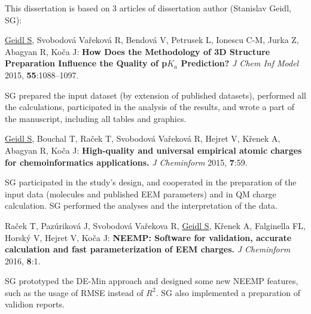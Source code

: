 \documentclass[11pt,b5paper,oneside,final]{book}
\begin{document}
This dissertation is based on 3 articles of dissertation author (Stanislav Geidl, SG): 

\vspace{10mm}

\underline{Geidl S}, Svobodová Vařeková R, Bendová V, Petrusek L, Ionescu C-M,
Jurka Z, Abagyan R, Koča J: \textbf{How Does the Methodology of 3D Structure
Preparation Influence the Quality of p$K_a$ Prediction?} \textit{J Chem Inf Model}
2015, \textbf{55}:1088–1097.

\vspace{5mm}

SG prepared the input dataset (by extension of published datasets), performed
all the calculations, participated in the analysis of the results, and wrote
a part of the manuscript, including all tables and graphics.

\vspace{10mm}

\underline{Geidl S}, Bouchal T, Raček T, Svobodová Vařeková R, Hejret V,
Křenek A, Abagyan R, Koča J: \textbf{High-quality and universal empirical atomic
charges for chemoinformatics applications.} \textit{J Cheminform} 2015,
\textbf{7}:59.

\vspace{5mm}

SG participated in the study's design, and cooperated in the preparation of
the input data (molecules and published EEM parameters) and in QM charge 
calculation. SG performed the analyses and the interpretation of the data.

\vspace{10mm}

Raček T, Pazúriková J, Svobodová Vařekova R, \underline{Geidl S}, Křenek A,
Falginella FL, Horský V, Hejret V, Koča J: \textbf{NEEMP: Software
for validation, accurate calculation and fast parameterization of EEM charges.}
\textit{J Cheminform} 2016, \textbf{8}:1.

\vspace{5mm}

SG prototyped the DE-Min approach and designed some new NEEMP features, such as
the usage of RMSE instead of $R^2$. SG also implemented a preparation of validion
reports.

\clearpage

\tableofcontents

\clearpage
{}


\renewcommand{\thesubfigure}{\Alph{subfigure}} %
\captionsetup[figure]{labelfont=bf} 
\captionsetup[subfigure]{labelfont=bf,labelformat=simple} %
\captionsetup[table]{labelfont=bf}
\captionsetup[subtable]{labelfont=bf}
\end{document}
